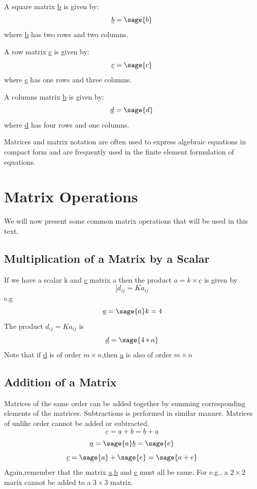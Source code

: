 \documentclass[12pt]{report}
\begin{document}
A square matrix \underline{b} is given by:
\begin{equation}
\underline{b}=\sage{b}
\label{eq:square}
\end{equation}
where \underline{b} has two rows and two columns.

A row matrix \underline{c} is given by:
\begin{equation}
\underline{c}=\sage{c}
\label{eq:row}
\end{equation}
where \underline{c} has one rows and three columns.

A columns matrix \underline{b} is given by:
\begin{equation}\underline{d}=\sage{d}
\label{eq:col}
\end{equation}
where \underline{d} has four rows and one columns.

Matrices and matrix notation are often used to express algebraic equations in compact form and are frequently used in the finite element formulation of equations.
\section{Matrix Operations}
We will now present some common matrix operations that will be used in this text.
\subsection{Multiplication of a Matrix by a Scalar}
If we have a scalar k and \underline{c} matrix a then the product $a = k \times \underline{c} $ is given by
\begin{equation}[d_{{ij}} = Ka_{{ij}} \label{eq:element}
\end{equation}
e.g
$$\underline{a}=\sage{a}
k= 4 $$
The product $d_{{ij}} = Ka_{{ij}}$ is 
$$\underline{d} = \sage{4*a}$$
Note that if \underline{d} is of order $ m \times n $,then \underline{a} is also of order $ m \times n $
\subsection{Addition of a Matrix}
Matrices of the same order can be added together by summing corresponding elements of the matrices. Subtractions is performed in similar manner. Matrices of unlike order cannot be added or subtracted.
\begin{equation}\underline{c}=\underline{a}+\underline{b}= \underline{b}+\underline{a} \end{equation}
$$\underline{a}=\sage{a}
\underline{b}=\sage{e}$$
$$\underline{c}=\sage{a} + \sage{e}=\sage{a+e}$$
Again,remember that the matrix \underline{a},\underline{b} and \underline{c} must all be same. For e.g., a $ 2 \times 2 $ marix cannot be added to a $ 3 \times 3 $ matrix.
\end{document}
